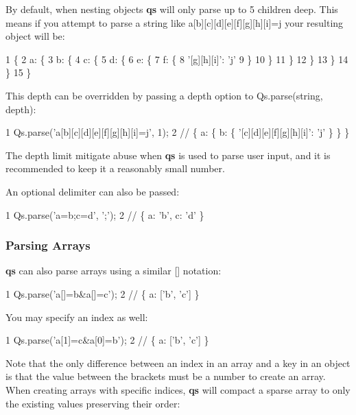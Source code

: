By default, when nesting objects {\bfseries qs} will only parse up to 5 children deep. This means if you attempt to parse a string like {\ttfamily \textquotesingle{}a\mbox{[}b\mbox{]}\mbox{[}c\mbox{]}\mbox{[}d\mbox{]}\mbox{[}e\mbox{]}\mbox{[}f\mbox{]}\mbox{[}g\mbox{]}\mbox{[}h\mbox{]}\mbox{[}i\mbox{]}=j\textquotesingle{}} your resulting object will be\+:


\begin{DoxyCode}
1 \{
2   a: \{
3     b: \{
4       c: \{
5         d: \{
6           e: \{
7             f: \{
8               '[g][h][i]': 'j'
9             \}
10           \}
11         \}
12       \}
13     \}
14   \}
15 \}
\end{DoxyCode}


This depth can be overridden by passing a {\ttfamily depth} option to {\ttfamily Qs.\+parse(string, depth)}\+:


\begin{DoxyCode}
1 Qs.parse('a[b][c][d][e][f][g][h][i]=j', 1);
2 // \{ a: \{ b: \{ '[c][d][e][f][g][h][i]': 'j' \} \} \}
\end{DoxyCode}


The depth limit mitigate abuse when {\bfseries qs} is used to parse user input, and it is recommended to keep it a reasonably small number.

An optional delimiter can also be passed\+:


\begin{DoxyCode}
1 Qs.parse('a=b;c=d', ';');
2 // \{ a: 'b', c: 'd' \}
\end{DoxyCode}


\subsubsection*{Parsing Arrays}

{\bfseries qs} can also parse arrays using a similar {\ttfamily \mbox{[}\mbox{]}} notation\+:


\begin{DoxyCode}
1 Qs.parse('a[]=b&a[]=c');
2 // \{ a: ['b', 'c'] \}
\end{DoxyCode}


You may specify an index as well\+:


\begin{DoxyCode}
1 Qs.parse('a[1]=c&a[0]=b');
2 // \{ a: ['b', 'c'] \}
\end{DoxyCode}


Note that the only difference between an index in an array and a key in an object is that the value between the brackets must be a number to create an array. When creating arrays with specific indices, {\bfseries qs} will compact a sparse array to only the existing values preserving their order\+:


